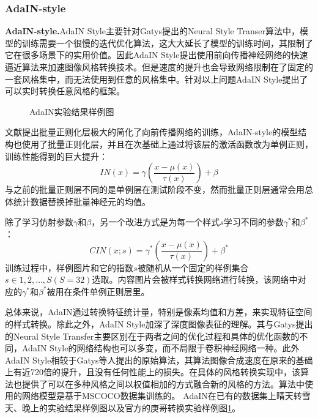 \subsubsection[AdaIN-style]{AdaIN-style}

\textbf{AdaIN-style.}\cite{adain}\quad AdaIN Style主要针对Gatys提出的Neural Style Transer算法中，模型的训练需要一个很慢的迭代优化算法，这大大延长了模型的训练时间，其限制了它在很多场景下的实用价值。因此AdaIN Style提出使用前向传播神经网络的快速逼近算法来加速图像风格转换技术。但是速度的提升也会导致网络限制在了固定的一套风格集中，而无法使用到任意的风格集中。针对以上问题AdaIN Style提出了可以实时转换任意风格的框架。

\begin{figure}[!hb]
    \centering
    \caption{AdaIN实验结果样例图}
    \label{fig:adin}
\end{figure}

文献\cite{ioffe}提出批量正则化层极大的简化了向前传播网络的训练，AdaIN-style的模型结构也使用了批量正则化层，并且在次基础上通过将该层的激活函数改为单例正则，训练性能得到的巨大提升：
$$ IN(x)=\gamma(\frac{x-\mu(x)}{\tau(x)})+\beta$$
与之前的批量正则层不同的是单例层在测试阶段不变，然而批量正则层通常会用总体统计数据替换掉批量神经元的均值。

除了学习仿射参数$\gamma$和$\beta$，另一个改进方式是为每一个样式$s$学习不同的参数$\gamma^*$和$\beta^*$：
$$CIN(x;s)=\gamma^*(\frac{x-\mu(x)}{\tau(x)})+\beta^*$$
训练过程中，样例图片和它的指数$s$被随机从一个固定的样例集合$s\in {1,2,\dots,S}(S=32)$选取。内容图片会被样式转换网络进行转换，该网络中对应的$\gamma^*$和$\beta^*$被用在条件单例正则层里。

总体来说，AdaIN通过转换特征统计量，特别是像素均值和方差，来实现特征空间的样式转换。除此之外，AdaIN Style加深了深度图像表征的理解。其与Gatys提出的Neural Style Transfer主要区别在于两者之间的优化过程和具体的优化函数的不同，AdaIN Style的网络结构也可以多变，而不局限于卷积神经网络一种。此外AdaIN Style相较于Gatys等人提出的原始算法，其算法图像合成速度在原来的基础上有近720倍的提升\cite{adin-github}，且没有任何性能上的损失。在具体的风格转换实现中，该算法也提供了可以在多种风格之间以权值相加的方式融合新的风格的方法。算法中使用的网络模型是基于MSCOCO\cite{mscoco}数据集训练的。
AdaIN在已有的数据集上晴天转雪天、晚上的实验结果样例图以及官方的庚哥转换实验样例图\ref{fig:adin}。

